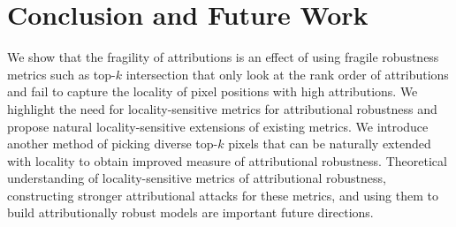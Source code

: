 \documentclass[letterpaper]{article} %
\begin{document}
\begin{table}[!ht]
\begin{center}
\caption{Average top-$k$ intersection, 3-LENS-prec@$k$ and 3-LENS-prec@$k$-div for random sign perturbation attack applied to different attribution methods on ImageNet for naturally and adversarially(PGD)-trained ResNet50 models.}
\label{table-topk-div-results-rand-imagenet}
\end{center}
\end{table}

\section{Conclusion and Future Work} \label{sec:conclusion}
We show that the fragility of attributions is an effect of using fragile robustness metrics such as top-$k$ intersection that only look at the rank order of attributions and fail to capture the locality of pixel positions with high attributions. We highlight the need for locality-sensitive metrics for attributional robustness and propose natural locality-sensitive extensions of existing metrics. We introduce another method of picking diverse top-$k$ pixels that can be naturally extended with locality to obtain improved measure of attributional robustness. Theoretical understanding of locality-sensitive metrics of attributional robustness, constructing stronger attributional attacks for these metrics, and using them to build attributionally robust models are important future directions.
\end{document}

